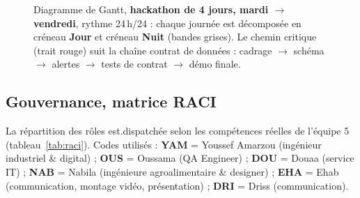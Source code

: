 \documentclass[11pt,a4paper]{article}
\begin{document}
\begin{figure}[H]
{}
\caption{Diagramme de Gantt, \textbf{hackathon de 4 jours, mardi $\rightarrow$ vendredi}, rythme
24\,h/24 : chaque journée est décomposée en créneau \textbf{Jour} et créneau \textbf{Nuit} (bandes
grises). Le chemin critique (trait rouge) suit la chaîne contrat de données : cadrage $\rightarrow$
schéma $\rightarrow$ alertes $\rightarrow$ tests de contrat $\rightarrow$ démo finale.}
\label{fig:gantt}
\end{figure}

\subsection{Gouvernance, matrice RACI}
La répartition des rôles est.dispatchée selon les compétences réelles de l'équipe 5 (tableau~\ref{tab:raci}).
Codes utilisés : \textbf{YAM} = Youssef Amarzou (ingénieur industriel \& digital) ; \textbf{OUS} =
Oussama (QA Engineer) ; \textbf{DOU} = Douaa (service IT) ; \textbf{NAB} = Nabila (ingénieure
agroalimentaire \& designer) ; \textbf{EHA} = Ehab (communication, montage vidéo, présentation) ;
\textbf{DRI} = Driss (communication).
\end{document}
